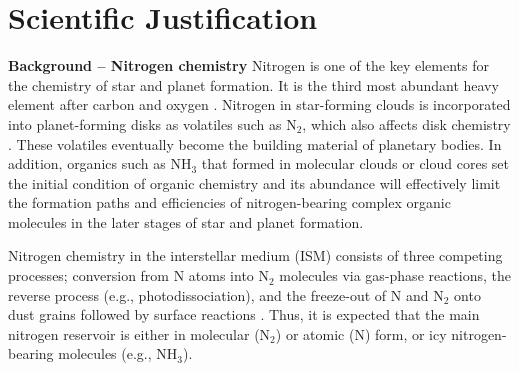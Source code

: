 \documentclass[12pt,a4paper]{article}  %
\newcommand{\ammonia}{NH$_3$\xspace}
\begin{document}
\pagestyle{plain}
 



\section{Scientific Justification}
\noindent \textbf{Background -- Nitrogen chemistry} \quad Nitrogen is one of the key elements for the chemistry of star and planet formation. It is the third most abundant heavy element after carbon and oxygen \citep{Przybilla08}. Nitrogen in star-forming clouds is incorporated into planet-forming disks as volatiles such as N$_2$, which also affects disk chemistry \citep[e.g.,][]{Schwarz14}. These volatiles eventually become the building material of planetary bodies. In addition, organics such as \ammonia that formed in molecular clouds or cloud cores set the initial condition of organic chemistry and its abundance will effectively limit the formation paths and efficiencies of nitrogen-bearing complex organic molecules in the later stages of star and planet formation.

\smallskip
\noindent Nitrogen chemistry in the interstellar medium (ISM) consists of three competing processes; conversion from N atoms into N$_2$ molecules via gas-phase reactions, the reverse process (e.g., photodissociation), and the freeze-out of N and N$_2$ onto dust grains followed by surface reactions \citep[e.g.,][]{Daranlot12}. Thus, it is expected that the main nitrogen reservoir is either in molecular (N$_2$) or atomic (N) form, or icy nitrogen-bearing molecules (e.g., \ammonia). 
\end{document}
